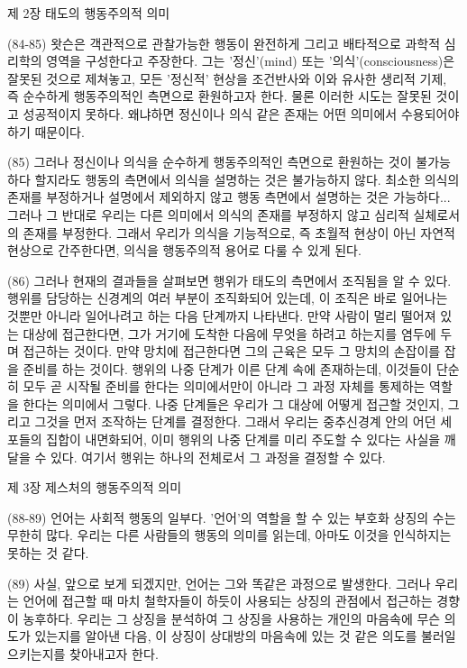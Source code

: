 \documentclass[12pt, a4paper]{article}
\begin{document}
제 2장 태도의 행동주의적 의미

(84-85) 왓슨은 객관적으로 관찰가능한 행동이 완전하게 그리고 배타적으로 과학적 심리학의 영역을 구성한다고 주장한다. 그는 '정신'(mind) 또는 '의식'(consciousness)은 잘못된 것으로 제쳐놓고, 모든 '정신적' 현상을 조건반사와 이와 유사한 생리적 기제, 즉 순수하게 행동주의적인 측면으로 환원하고자 한다. 물론 이러한 시도는 잘못된 것이고 성공적이지 못하다. 왜냐하면 정신이나 의식 같은 존재는 어떤 의미에서 수용되어야 하기 때문이다.

(85) 그러나 정신이나 의식을 순수하게 행동주의적인 측면으로 환원하는 것이 불가능하다 할지라도 행동의 측면에서 의식을 설명하는 것은 불가능하지 않다. 최소한 의식의 존재를 부정하거나 설명에서 제외하지 않고 행동 측면에서 설명하는 것은 가능하다... 그러나 그 반대로 우리는 다른 의미에서 의식의 존재를 부정하지 않고 심리적 실체로서의 존재를 부정한다. 그래서 우리가 의식을 기능적으로, 즉 초월적 현상이 아닌 자연적 현상으로 간주한다면, 의식을 행동주의적 용어로 다룰 수 있게 된다. 

(86) 그러나 현재의 결과들을 살펴보면 행위가 태도의 측면에서 조직됨을 알 수 있다. 행위를 담당하는 신경계의 여러 부분이 조직화되어 있는데, 이 조직은 바로 일어나는 것뿐만 아니라 일어나려고 하는 다음 단계까지 나타낸다. 만약 사람이 멀리 떨어져 있는 대상에 접근한다면, 그가 거기에 도착한 다음에 무엇을 하려고 하는지를 염두에 두며 접근하는 것이다. 만약 망치에 접근한다면 그의 근육은 모두 그 망치의 손잡이를 잡을 준비를 하는 것이다. 행위의 나중 단계가 이른 단계 속에 존재하는데, 이것들이 단순히 모두 곧 시작될 준비를 한다는 의미에서만이 아니라 그 과정 자체를 통제하는 역할을 한다는 의미에서 그렇다. 나중 단계들은 우리가 그 대상에 어떻게 접근할 것인지, 그리고 그것을 먼저 조작하는 단계를 결정한다. 그래서 우리는 중추신경계 안의 어던 세포들의 집합이 내면화되어, 이미 행위의 나중 단계를 미리 주도할 수 있다는 사실을 깨달을 수 있다. 여기서 행위는 하나의 전체로서 그 과정을 결정할 수 있다. 

제 3장 제스처의 행동주의적 의미

(88-89) 언어는 사회적 행동의 일부다. '언어'의 역할을 할 수 있는 부호화 상징의 수는 무한히 많다. 우리는 다른 사람들의 행동의 의미를 읽는데, 아마도 이것을 인식하지는 못하는 것 같다. 

(89) 사실, 앞으로 보게 되겠지만, 언어는 그와 똑같은 과정으로 발생한다. 그러나 우리는 언어에 접근할 때 마치 철학자들이 하듯이 사용되는 상징의 관점에서 접근하는 경향이 농후하다. 우리는 그 상징을 분석하여 그 상징을 사용하는 개인의 마음속에 무슨 의도가 있는지를 알아낸 다음, 이 상징이 상대방의 마음속에 있는 것 같은 의도를 불러일으키는지를 찾아내고자 한다.
\end{document}
